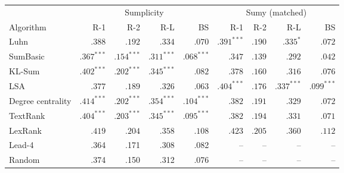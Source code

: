 \begin{tabular}{l r r r r r r r r}
\toprule
 & \multicolumn{4}{c}{Sumplicity} & \multicolumn{4}{c}{Sumy (matched)} \\
\cmidrule(lr){2-5}\cmidrule(lr){6-9}
Algorithm & R-1 & R-2 & R-L & BS & R-1 & R-2 & R-L & BS \\
\midrule
Luhn & $.388$ & $.192$ & $.334$ & $.070$ & $\mathbf{.391}^{***}$ & $.190$ & $\mathbf{.335}^{*}$ & $.072$ \\
SumBasic & $\mathbf{.367}^{***}$ & $\mathbf{.154}^{***}$ & $\mathbf{.311}^{***}$ & $\mathbf{.068}^{***}$ & $.347$ & $.139$ & $.292$ & $.042$ \\
KL-Sum & $\mathbf{.402}^{***}$ & $\mathbf{.202}^{***}$ & $\mathbf{.345}^{***}$ & $.082$ & $.378$ & $.160$ & $.316$ & $.076$ \\
LSA & $.377$ & $.189$ & $.326$ & $.063$ & $\mathbf{.404}^{***}$ & $.176$ & $\mathbf{.337}^{***}$ & $\mathbf{.099}^{***}$ \\
Degree centrality & $\mathbf{.414}^{***}$ & $\mathbf{.202}^{***}$ & $\mathbf{.354}^{***}$ & $\mathbf{.104}^{***}$ & $.382$ & $.191$ & $.329$ & $.072$ \\
TextRank & $\mathbf{.404}^{***}$ & $\mathbf{.203}^{***}$ & $\mathbf{.345}^{***}$ & $\mathbf{.095}^{***}$ & $.382$ & $.194$ & $.331$ & $.071$ \\
LexRank & $.419$ & $.204$ & $.358$ & $.108$ & $.423$ & $.205$ & $.360$ & $.112$ \\
\midrule
Lead-4 & .364 & .171 & .308 & .082 & -- & -- & -- & -- \\
Random & .374 & .150 & .312 & .076 & -- & -- & -- & -- \\
\bottomrule
\end{tabular}
